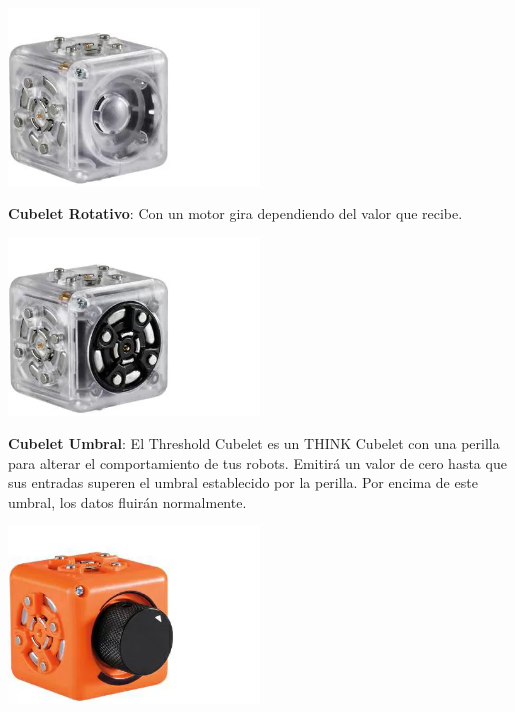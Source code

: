 \begin{itemize}
\begin{minipage}
            \centering
            \includegraphics[width=0.5\textwidth]{./images/marco_teorico/cubelets/buzzer.png}
        \end{minipage}
        \begin{minipage}
            {0.5\textwidth}
            \item \textbf{Cubelet Rotativo}: Con un motor gira dependiendo del valor que recibe.
        \end{minipage}
        \begin{minipage}
            {0.5\textwidth}
            \centering
            \includegraphics[width=0.5\textwidth]{./images/marco_teorico/cubelets/rotativo.png}
        \end{minipage}
        \begin{minipage}
            {0.5\textwidth}
            \item \textbf{Cubelet Umbral}:  El Threshold Cubelet es un THINK Cubelet con una perilla para alterar 
                el comportamiento de tus robots. Emitir\'a un valor de cero hasta que sus entradas superen el umbral establecido 
                por la perilla. Por encima de este umbral, los datos fluir\'an normalmente.
        \end{minipage}
        \begin{minipage}
            {0.5\textwidth}
            \centering
            \includegraphics[width=0.5\textwidth]{./images/marco_teorico/cubelets/umbral.png}
        \end{minipage}
    \end{itemize}